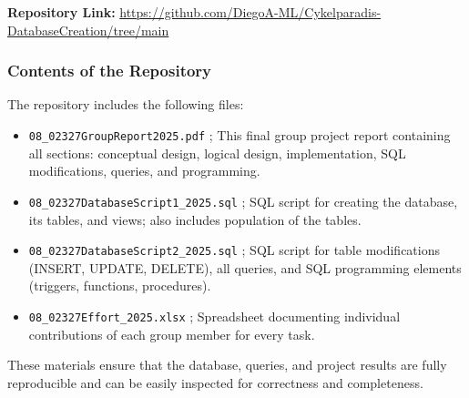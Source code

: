 \documentclass[dtu]{dtuarticle}
\begin{document}
\textbf{Repository Link:} \url{https://github.com/DiegoA-ML/Cykelparadis-DatabaseCreation/tree/main}

\subsubsection*{Contents of the Repository}

The repository includes the following files:

\begin{itemize}
    \item \texttt{08\_02327GroupReport2025.pdf} ; This final group project report containing all sections: conceptual design, logical design, implementation, SQL modifications, queries, and programming.
    \item \texttt{08\_02327DatabaseScript1\_2025.sql} ; SQL script for creating the database, its tables, and views; also includes population of the tables.
    \item \texttt{08\_02327DatabaseScript2\_2025.sql} ; SQL script for table modifications (INSERT, UPDATE, DELETE), all queries, and SQL programming elements (triggers, functions, procedures).
    \item \texttt{08\_02327Effort\_2025.xlsx} ; Spreadsheet documenting individual contributions of each group member for every task.
\end{itemize}

These materials ensure that the database, queries, and project results are fully reproducible and can be easily inspected for correctness and completeness.
\end{document}
